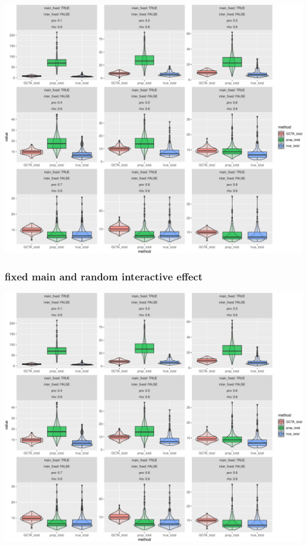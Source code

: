 \documentclass[]{article}
\begin{document}
\includegraphics{Simulation_report_chi_resamle_files/figure-latex/fixed fixed-1.pdf}

\subsubsection{fixed main and random interactive
effect}\label{fixed-main-and-random-interactive-effect}

\includegraphics{Simulation_report_chi_resamle_files/figure-latex/fixed random-1.pdf}
\end{document}
